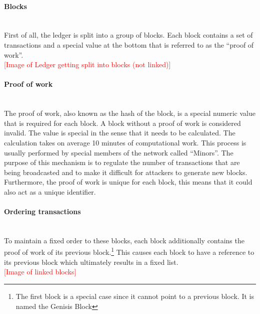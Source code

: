 \documentclass[a4paper, 12pt]{report}
\begin{document}
\paragraph{Blocks} \hspace{0pt} \\
First of all, the ledger is split into a group of blocks. Each block contains a set of transactions and a special value at the bottom that is referred to as the “proof of work”. 
\\ \textcolor{red}{[Image of Ledger getting split into blocks (not linked)]} \\
\paragraph{Proof of work} \hspace{0pt} \\
The proof of work, also known as the hash of the block, is a special numeric value that is required for each block. A block without a proof of work is considered invalid. The value is special in the sense that it needs to be calculated. The calculation takes on average 10 minutes of computational work. This process is usually performed by special members of the network called “Minors”. The purpose of this mechanism is to regulate the number of transactions that are being broadcasted and to make it difficult for attackers to generate new blocks. Furthermore, the proof of work is unique for each block, this means that it could also act as a unique identifier.
\paragraph{Ordering transactions} \hspace{0pt} \\
To maintain a fixed order to these blocks, each block additionally contains the proof of work of its previous block.\footnote{The first block is a special case since it cannot point to a previous block. It is named the Genisis Block} This causes each block to have a reference to its previous block which ultimately results in a fixed list.
\\ \textcolor{red}{[Image of linked blocks]} \\
\end{document}
